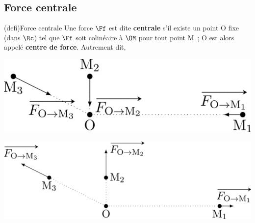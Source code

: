 \documentclass[../../main/main.tex]{subfiles}
\begin{document}
\subsection{Force centrale}
\begin{tcb*}(defi){Force centrale}
	Une force $\Ff$ est dite \textbf{centrale} s'il existe un point O fixe (dans
	$\Rc$) tel que $\Ff$ soit colinéaire à $\OM$ pour tout point M~; O est alors
	appelé \textbf{centre de force}. Autrement dit,
	\psw{
		\[
			\Ff \qMath{centrale}
			\Lra
			\boxed{\Ff \parr \OM}
			\Lra
			\boxed{\Ff = F(\Mr) \ur}
		\]
	}
	\vspace{-15pt}
	\smallbreak
	\begin{isd}
		\begin{center}
			\includegraphics[width=\linewidth]{intro_att}
		\end{center}
		\tcblower
		\begin{center}
			\includegraphics[width=\linewidth]{intro_rep}
		\end{center}
	\end{isd}
\end{tcb*}
\end{document}
